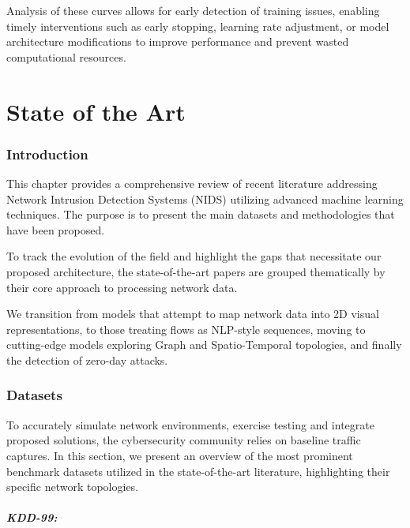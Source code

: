 \documentclass[12pt, a4paper]{report}
\begin{document}
Analysis of these curves allows for early detection of training issues, enabling timely interventions such as early stopping, learning rate adjustment, or model architecture modifications to improve performance and prevent wasted computational resources.








\part{State of the Art}

\section{Introduction}
This chapter provides a comprehensive review of recent literature addressing Network Intrusion Detection Systems (NIDS) utilizing advanced machine learning techniques. The purpose is to present the main datasets and methodologies that have been proposed. 

To track the evolution of the field and highlight the gaps that necessitate our proposed architecture, the state-of-the-art papers are grouped thematically by their core approach to processing network data. 

We transition from models that attempt to map network data into 2D visual representations, to those treating flows as NLP-style sequences, moving to cutting-edge models exploring Graph and Spatio-Temporal topologies, and finally the detection of zero-day attacks.

\section{Datasets}

 To accurately simulate network environments, exercise  testing  and  integrate proposed solutions, the cybersecurity community relies on baseline traffic captures. 
 In this section, we present an overview of the most prominent benchmark datasets utilized in the state-of-the-art literature, highlighting their specific network topologies.


\subsubsection{KDD-99:}
\end{document}
